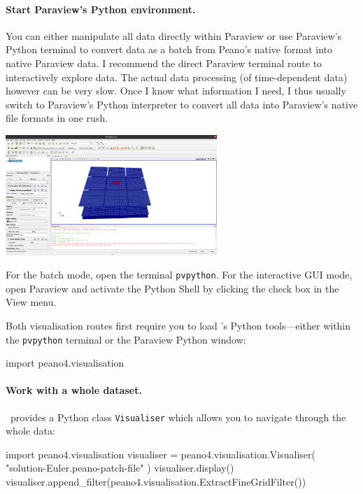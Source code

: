 \paragraph{Start Paraview's Python environment.}
%
%
You can either manipulate all data directly within Paraview or use Paraview's Python 
terminal to convert data as a batch from Peano's native format into native Paraview data.
I recommend the direct Paraview terminal route to interactively explore data.
The actual data processing (of time-dependent data) however can be very slow.
Once I know what information I need, I thus usually switch to Paraview's Python interpreter 
to convert all data into Paraview's native file formats in one rush.


\begin{center}
 \includegraphics[width=0.6\textwidth]{80_postprocessing/paraview.png}
\end{center}


For the batch mode, open the terminal \texttt{pvpython}.
For the interactive GUI mode, open Paraview and activate the Python Shell by clicking the check box in
the View menu.


Both visualisation routes first require you to load \Peano's Python tools---either
within the \texttt{pvpython} terminal or the Paraview Python window:
\begin{code}
import peano4.visualisation  
\end{code}


\paragraph{Work with a whole dataset.}
%
%
%
\Peano\ provides a Python class \texttt{Visualiser} which allows you to navigate through the whole data:
\begin{code}
import peano4.visualisation
visualiser = peano4.visualisation.Visualiser( "solution-Euler.peano-patch-file" )
visualiser.display()
visualiser.append_filter(peano4.visualisation.ExtractFineGridFilter())
\end{code}

